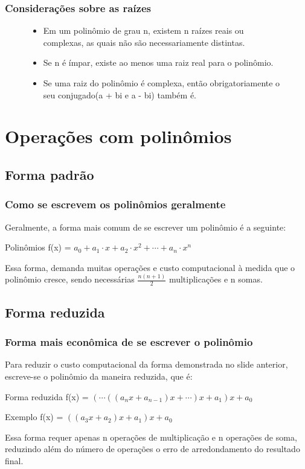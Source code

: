 \documentclass{beamer}
\begin{document}
\begin{frame}
\frametitle{Considerações sobre as raízes}
\begin{figure}
	\begin{itemize}
		\item Em um polinômio de grau n, existem n raízes reais ou complexas, as quais não são necessariamente distintas.
		\item Se n é ímpar, existe ao menos uma raiz real para o polinômio.
		\item Se uma raiz do polinômio é complexa, então obrigatoriamente o seu conjugado(a + bi e a - bi) também é. 
	\end{itemize}
\end{figure}
\end{frame}


\section{Operações com polinômios}

\subsection{Forma padrão}
\begin{frame}
\frametitle{Como se escrevem os polinômios geralmente}
	Geralmente, a forma mais comum de se escrever um polinômio é a seguinte:
	\begin{block}{Polinômios}
		f(x) = $a_0 + a_1\cdot x + a_2\cdot x^2 + \cdots + a_n \cdot x^n$
	\end{block}

	Essa forma, demanda muitas operações e custo computacional à medida que o polinômio cresce, sendo necessárias $\frac{n\left(n+1\right)}{2}$ multiplicações e n somas.	
\end{frame}

\subsection{Forma reduzida}
\begin{frame}
\frametitle{Forma mais econômica de se escrever o polinômio}
	Para reduzir o custo computacional da forma demonstrada no slide anterior, escreve-se o polinômio da maneira reduzida, que é:
	
	\begin{block}{Forma reduzida}
		f(x) = $\left(\cdots\left(\left(a_n x + a_{n-1}\right)x + \cdots\right)x + a_1\right)x + a_0$
	\end{block}

	\begin{block}{Exemplo}
		f(x) = $\left(\left(a_3 x + a_2\right)x + a_1\right)x + a_0$
	\end{block}

    Essa forma requer apenas n operações de multiplicação e n operações de soma, reduzindo além do número de operações o erro de arredondamento do resultado final.
\end{frame}
\end{document}
